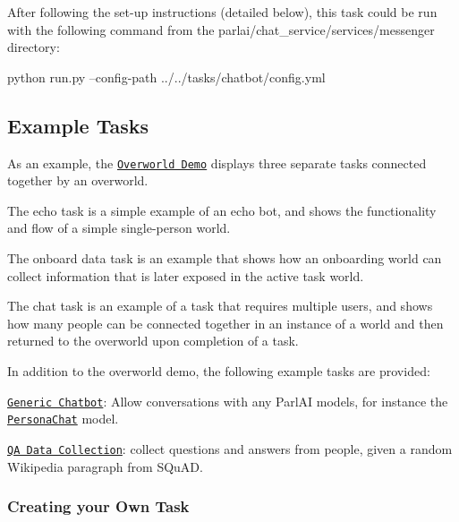 After following the set-\/up instructions (detailed below), this task could be run with the following command from the {\ttfamily parlai/chat\+\_\+service/services/messenger} directory\+: 
\begin{DoxyCode}
python run.py --config-path ../../tasks/chatbot/config.yml
\end{DoxyCode}


\subsection*{Example Tasks}

As an example, the \href{https://github.com/facebookresearch/ParlAI/blob/master/parlai/chat_service/tasks/overworld_demo/}{\tt Overworld Demo} displays three separate tasks connected together by an overworld.


\begin{DoxyItemize}
\item The {\ttfamily echo} task is a simple example of an echo bot, and shows the functionality and flow of a simple single-\/person world.
\item The {\ttfamily onboard data} task is an example that shows how an onboarding world can collect information that is later exposed in the active task world.
\item The {\ttfamily chat} task is an example of a task that requires multiple users, and shows how many people can be connected together in an instance of a world and then returned to the overworld upon completion of a task.
\end{DoxyItemize}

In addition to the overworld demo, the following example tasks are provided\+:


\begin{DoxyItemize}
\item \href{https://github.com/facebookresearch/ParlAI/blob/master/parlai/chat_service/tasks/chatbot/}{\tt Generic Chatbot}\+: Allow conversations with any Parl\+AI models, for instance the \href{https://github.com/facebookresearch/ParlAI/tree/master/projects/personachat}{\tt Persona\+Chat} model.
\item \href{https://github.com/facebookresearch/ParlAI/blob/master/parlai/chat_service/tasks/qa_data_collection/}{\tt QA Data Collection}\+: collect questions and answers from people, given a random Wikipedia paragraph from S\+Qu\+AD.
\end{DoxyItemize}

\subsubsection*{Creating your Own Task}

